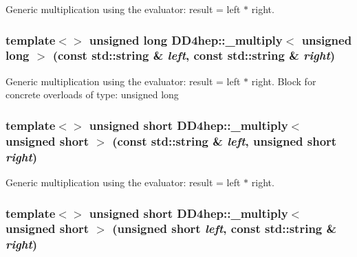 Generic multiplication using the evaluator: result = left $\ast$ right. \hypertarget{group___d_d4_h_e_p___g_e_o_m_e_t_r_y_ga3bf4c1e0a6c9909d8afe54e14db02807}{
\subsubsection[{\_\-multiply$<$ unsigned long $>$}]{\setlength{\rightskip}{0pt plus 5cm}template$<$$>$ unsigned long DD4hep::\_\-multiply$<$ unsigned long $>$ (const std::string \& {\em left}, \/  const std::string \& {\em right})}}
\label{group___d_d4_h_e_p___g_e_o_m_e_t_r_y_ga3bf4c1e0a6c9909d8afe54e14db02807}


Generic multiplication using the evaluator: result = left $\ast$ right. Block for concrete overloads of type: unsigned long \hypertarget{group___d_d4_h_e_p___g_e_o_m_e_t_r_y_gabd00a1e32b7fc41a33e0372b7657475c}{
\subsubsection[{\_\-multiply$<$ unsigned short $>$}]{\setlength{\rightskip}{0pt plus 5cm}template$<$$>$ unsigned short DD4hep::\_\-multiply$<$ unsigned short $>$ (const std::string \& {\em left}, \/  unsigned short {\em right})}}
\label{group___d_d4_h_e_p___g_e_o_m_e_t_r_y_gabd00a1e32b7fc41a33e0372b7657475c}


Generic multiplication using the evaluator: result = left $\ast$ right. \hypertarget{group___d_d4_h_e_p___g_e_o_m_e_t_r_y_gacac2a6cbdf2e86db855804622da26514}{
\subsubsection[{\_\-multiply$<$ unsigned short $>$}]{\setlength{\rightskip}{0pt plus 5cm}template$<$$>$ unsigned short DD4hep::\_\-multiply$<$ unsigned short $>$ (unsigned short {\em left}, \/  const std::string \& {\em right})}}
\label{group___d_d4_h_e_p___g_e_o_m_e_t_r_y_gacac2a6cbdf2e86db855804622da26514}


